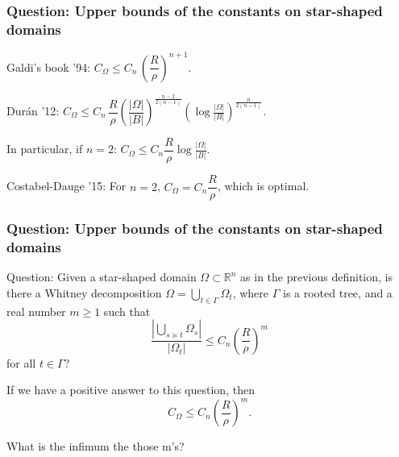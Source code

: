 \documentclass[small,xcolor=svgnames]{beamer}
\def\bs{\bigskip}
\def\O{\Omega}
\def\R{{\mathbb R}}
\def\c{\color{blue}}
\begin{document}

\begin{frame}\frametitle{Question: Upper bounds of the constants on star-shaped domains}

Galdi's book '94: {\c$C_\O\leq C_n\,\left(\dfrac{R}{\rho}\right)^{n+1}$}.

\bs

Dur\'an '12: {\c $C_\O\leq C_n\, \dfrac{R}{\rho} \left(\dfrac{|\O|}{|B|}\right)^{\frac{n-2}{2(n-1)}}\left(\log\frac{|\Omega|}{|B|}\right)^{\frac{n}{2(n-1)}}$}.

\bs

In particular, if $n=2$: $C_\O\leq C_n\dfrac{R}{\rho}\log\frac{|\Omega|}{|B|}$.

\bs

Costabel-Dauge '15: For $n=2$, {\c $C_\O=C_n \dfrac{R}{\rho}$}, which is optimal. 

\end{frame}

\begin{frame}\frametitle{Question: Upper bounds of the constants on star-shaped domains}

{\c Question:}
Given a star-shaped domain $\O\subset\R^n$ as in the previous definition, is there a Whitney decomposition $\O=\bigcup_{t\in\Gamma} \O_t$, where $\Gamma$ is a rooted tree, and a real number $m\geq 1$ such that 
\[\dfrac{\left|\bigcup_{s\succeq t}\O_s\right|}{\left|\O_t\right|}\leq C_n \left(\frac{R}{\rho}\right)^m\]
for all $t\in\Gamma$?

\bigskip

If we have a positive answer to this question, then 
\[C_\O\leq C_n \left(\frac{R}{\rho}\right)^m.\]

\bigskip

What is the infimum the those m's?

\end{frame}


\end{document}
